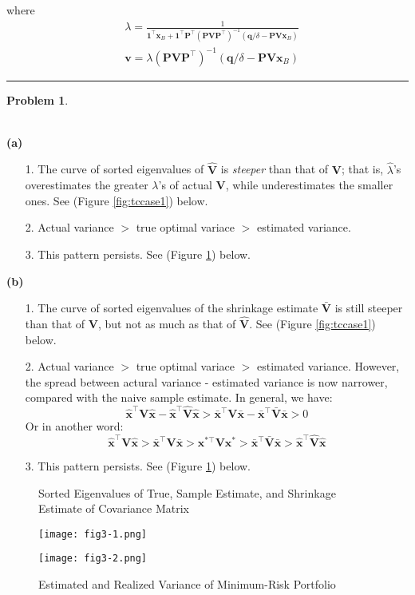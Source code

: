 \documentclass[a4paper, 8pt]{article}
\theoremstyle{definition}
\newtheorem{problem}{Problem}
\theoremstyle{hSol}
\begin{document}
	where
	\begin{equation}
		\begin{split}
			&\lambda = \frac{1}{\bm{1}^{\top}\bm{x}_B + \bm{1}^{\top}\bm{P}^{\top}(\bm{P}\bm{V}\bm{P}^{\top})^{-1}(\bm{q}/\delta-\bm{P} \bm{V}\bm{x}_B)} \\
			&\bm{v} = \lambda (\bm{P}\bm{V}\bm{P}^{\top})^{-1}(\bm{q}/\delta-\bm{P} \bm{V}\bm{x}_B)
		\end{split}
	\end{equation}
	\noindent\rule{16cm}{0.4pt}
\begin{problem}
\end{problem}~\\
\textbf{(a)}
\begin{itemize}
	\item[1.] The curve of sorted eigenvalues of $\widehat{\bm{V}}$ is \emph{steeper} than that of $\bm{V}$; that is, $\hat{\lambda}$'s overestimates the greater $\lambda$'s of actual $\bm{V}$, while underestimates the smaller ones. See (Figure \ref{fig:tccase1}) below.
	\item[2.] Actual variance $>$ true optimal variace $>$ estimated variance.
	\item[3.] This pattern persists. See (Figure \ref{fig:tccase2}) below.
\end{itemize}
\textbf{(b)}
\begin{itemize}
	\item[1.] The curve of sorted eigenvalues of the shrinkage estimate $\bar{\bm{V}}$ is still steeper than that of $\bm{V}$, but not as much as that of $\hat{\bm{V}}$. See (Figure \ref{fig:tccase1}) below.
	\item[2.] Actual variance $>$ true optimal variace $>$ estimated variance. However, the spread between actural variance - estimated variance is now narrower, compared with the naive sample estimate. In general, we have:
	\begin{equation}
		\hat{\bm{x}}^{\top} \bm{V}\hat{\bm{x}} - \hat{\bm{x}}^{\top} \widehat{\bm{V}}\hat{\bm{x}} > \bar{\bm{x}}^{\top} \bm{V}\bar{\bm{x}} - \bar{\bm{x}}^{\top} \bar{\bm{V}}\bar{\bm{x}} > 0
	\end{equation}
	Or in another word:
	\begin{equation}
		\hat{\bm{x}}^{\top} \bm{V}\hat{\bm{x}} > \bar{\bm{x}}^{\top} \bm{V}\bar{\bm{x}} > \bm{x}^{*\top} \bm{V}\bm{x}^* >  \bar{\bm{x}}^{\top} \bar{\bm{V}}\bar{\bm{x}} > \hat{\bm{x}}^{\top} \widehat{\bm{V}}\hat{\bm{x}}
	\end{equation}
	\item[3.] This pattern persists. See (Figure \ref{fig:tccase2}) below.
\end{itemize}
\begin{figure}[H]
  \centering
  \caption{\label{fig:tccase1}Sorted Eigenvalues of True, Sample Estimate, and Shrinkage Estimate of Covariance Matrix}
  \texttt{[image: fig3-1.png]}
  \vspace{25pt}

  \centering
  \caption{\label{fig:tccase2}Estimated and Realized Variance of Minimum-Risk Portfolio}
  \texttt{[image: fig3-2.png]}
  \vspace{25pt}
\end{figure}
\end{document}

